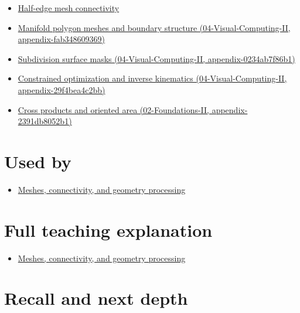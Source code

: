 \begin{itemize}
\tightlist
\item
  \hyperref[appendix-1aea26b2307f]{Half-edge mesh connectivity}
\item
  \href{../04-Visual-Computing-II/main.pdf\#nameddest=appendix-fab348609369}{Manifold polygon meshes and boundary structure (04-Visual-Computing-II, appendix-fab348609369)}
\item
  \href{../04-Visual-Computing-II/main.pdf\#nameddest=appendix-0234ab7f86b1}{Subdivision surface masks (04-Visual-Computing-II, appendix-0234ab7f86b1)}
\item
  \href{../04-Visual-Computing-II/main.pdf\#nameddest=appendix-29f4bea4c2bb}{Constrained optimization and inverse kinematics (04-Visual-Computing-II, appendix-29f4bea4c2bb)}
\item
  \href{../02-Foundations-II/main.pdf\#nameddest=appendix-2391db8052b1}{Cross products and oriented area (02-Foundations-II, appendix-2391db8052b1)}
\end{itemize}

\section{Used by}\label{appendix-7107009c505b-used-by}

\begin{itemize}
\tightlist
\item
  \href{Continuous\%20Notes/University\%20-\%20Worlds,\%20Images\%20and\%20Inference\%20-\%20Graphics,\%20Vision\%20and\%20Photography\#Meshes,\%20connectivity,\%20and\%20geometry\%20processing}{Meshes, connectivity, and geometry processing}
\end{itemize}

\section{Full teaching explanation}\label{appendix-7107009c505b-full-teaching-explanation}

\begin{itemize}
\tightlist
\item
  \href{Continuous\%20Notes/University\%20-\%20Worlds,\%20Images\%20and\%20Inference\%20-\%20Graphics,\%20Vision\%20and\%20Photography\#Meshes,\%20connectivity,\%20and\%20geometry\%20processing}{Meshes, connectivity, and geometry processing}
\end{itemize}

\section{Recall and next depth}\label{appendix-7107009c505b-recall-and-next-depth}

